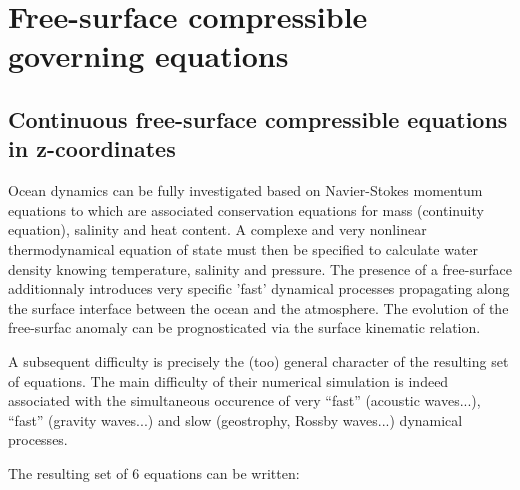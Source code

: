 \documentclass[a4paper]{article}
\numberwithin{equation}{section}
\begin{document}
\section{Free-surface compressible governing equations}

 \subsection{Continuous free-surface compressible equations in z-coordinates}
 
 Ocean dynamics can be fully investigated based on Navier-Stokes momentum  equations to which are associated conservation equations for mass (continuity equation), salinity and heat content. A complexe and very nonlinear thermodynamical equation of state must then be specified to calculate water density knowing temperature, salinity and pressure. The presence of a free-surface additionnaly introduces very specific 'fast' dynamical processes propagating along the surface interface between the ocean and the atmosphere. The evolution of the free-surfac anomaly can be prognosticated via the surface kinematic relation.
 
 A subsequent difficulty is precisely the (too) general character of the resulting set of equations. The main difficulty of their numerical simulation is indeed associated with the simultaneous occurence of very ``fast'' (acoustic waves...), ``fast'' (gravity waves...) and slow (geostrophy, Rossby waves...) dynamical processes.
 
 The resulting set of 6 equations can be written:
 
\end{document}

